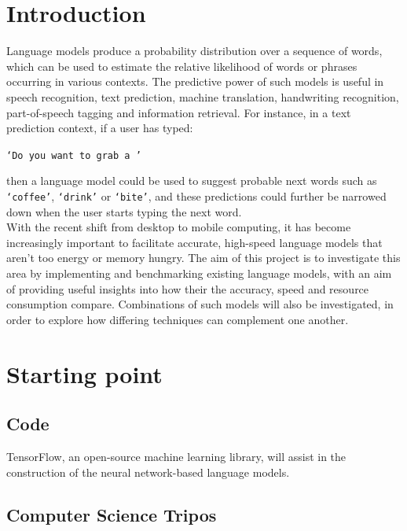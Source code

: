 \documentclass[a4paper, 12pt]{article}
\newcommand{\ttt}[1]{\texttt{#1}}
\begin{document}
\section*{Introduction}
Language models produce a probability distribution over a sequence of words, which can be used to estimate the relative likelihood of words or phrases occurring in various contexts. The predictive power of such models is useful in speech recognition, text prediction, machine translation, handwriting recognition, part-of-speech tagging and information retrieval. For instance, in a text prediction context, if a user has typed:

\begin{center}
	\ttt{`Do you want to grab a '}
\end{center}

\noindent
then a language model could be used to suggest probable next words such as \ttt{`coffee'}, \ttt{`drink'} or \ttt{`bite'}, and these predictions could further be narrowed down when the user starts typing the next word. \\

\noindent
With the recent shift from desktop to mobile computing, it has become increasingly important to facilitate accurate, high-speed language models that aren't too energy or memory hungry. The aim of this project is to investigate this area by implementing and benchmarking existing language models, with an aim of providing useful insights into how their the accuracy, speed and resource consumption compare. Combinations of such models will also be investigated, in order to explore how differing techniques can complement one another.

\section*{Starting point}

\subsection*{Code}
TensorFlow, an open-source machine learning library, will assist in the construction of the neural network-based language models.

\subsection*{Computer Science Tripos}
\end{document}
